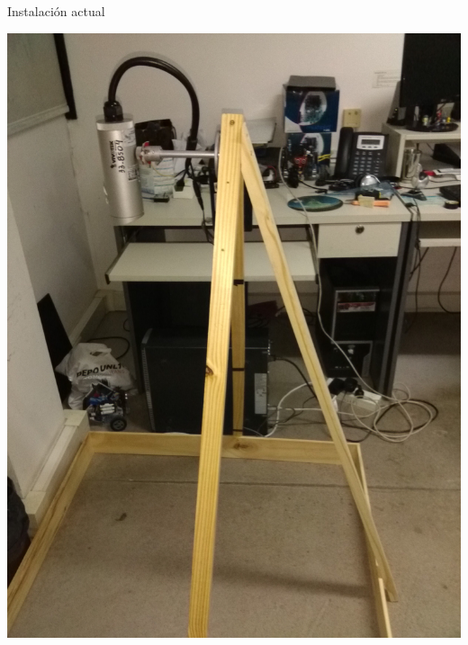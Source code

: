\documentclass{beamer}
\begin{document}
\begin{frame}{Instalación actual}
    \begin{minipage}{0.5\linewidth}
        \includegraphics[width=\linewidth]{images/inst1}
    \end{minipage}%
    \begin{minipage}{0.5\linewidth}

\end{minipage}
\end{frame}
\end{document}
